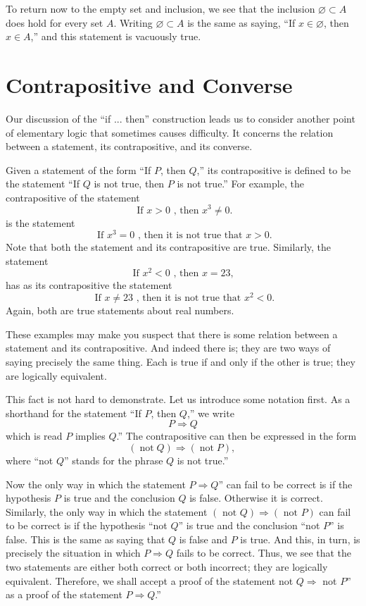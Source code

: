 To return now to the empty set and inclusion, we see that the inclusion 
\(\varnothing \subset A\) does hold for every set \(A\). Writing \(\varnothing \subset A\) 
is the same as saying, ``If \(x \in \varnothing\), then \(x \in A\),'' and this 
statement is vacuously true.

\section*{Contrapositive and Converse}

Our discussion of the ``if ... then'' construction leads us to consider another point 
of elementary logic that sometimes causes difficulty. It concerns the relation between 
a statement, its contrapositive, and its converse.

Given a statement of the form ``If \(P\), then \(Q\),'' its contrapositive is defined 
to be the statement ``If \(Q\) is not true, then \(P\) is not true.'' For example, 
the contrapositive of the statement
\[
\text{ If }x > 0\text{ , then }x^{3} \neq 0\text{.}
\]
is the statement
\[
\text{ If }x^{3} = 0\text{ , then it is not true that }x > 0\text{.}
\]
Note that both the statement and its contrapositive are true. Similarly, the statement
\[
\text{ If }x^{2} < 0\text{ , then }x = {23}\text{, }
\]
has as its contrapositive the statement
\[
\text{ If }x \neq {23}\text{ , then it is not true that }x^{2} < 0\text{.}
\]
Again, both are true statements about real numbers.

These examples may make you suspect that there is some relation between a statement 
and its contrapositive. And indeed there is; they are two ways of saying precisely the 
same thing. Each is true if and only if the other is true; they are logically equivalent.

This fact is not hard to demonstrate. Let us introduce some notation first. As a 
shorthand for the statement ``If \(P\), then \(Q\),'' we write
\[
P \Rightarrow Q
\]
which is read \(P\) implies \(Q\).'' The contrapositive can then be expressed in the form
\[
({\operatorname{not}Q}) \Rightarrow ({\operatorname{not}P}) \text{, }
\]
where ``not \(Q\)'' stands for the phrase \(Q\) is not true.''

Now the only way in which the statement \(P \Rightarrow Q\)'' can fail to be correct 
is if the hypothesis \(P\) is true and the conclusion \(Q\) is false. Otherwise it is correct. 
Similarly, the only way in which the statement \(({\text{ not }Q}) \Rightarrow ({\text{ not }P})\) 
can fail to be correct is if the hypothesis ``not \(Q\)'' is true and the conclusion 
``not \(P\)'' is false. This is the same as saying that \(Q\) is false and \(P\) is true. 
And this, in turn, is precisely the situation in which \(P \Rightarrow Q\) fails to be correct. 
Thus, we see that the two statements are either both correct or both incorrect; they are logically 
equivalent. Therefore, we shall accept a proof of the statement not \(Q \Rightarrow\) not \(P\)'' 
as a proof of the statement \(P \Rightarrow Q\).''

